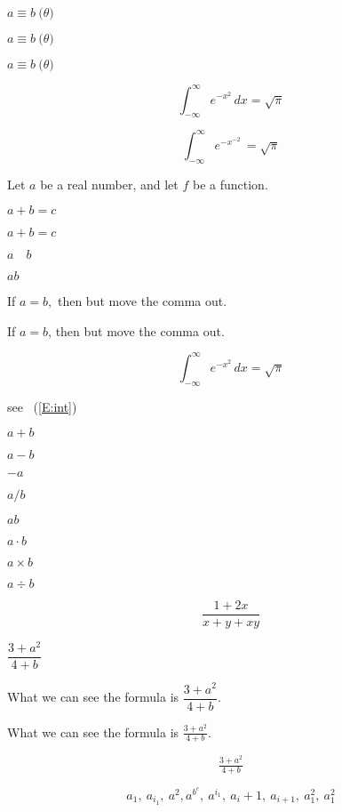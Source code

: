 \documentclass{article}
\begin{document}
	
$a \equiv b \pod {\theta} $

\(a \equiv b \pod{\theta} \)

\begin{math}
	a \equiv b \pod{\theta}
\end{math}
	
\[
	\int_{-\infty}^{\infty} e^{-x^{2}} \, dx = \sqrt{\pi}
\]	
	
\begin{displaymath}
	\int_{-\infty}^{\infty} e^{-x^{-2}} \, = \sqrt{\pi}
\end{displaymath}

Let $a$ be a real number, and let $f$ be a function.




$a+b=c$

$a +b = c$

$a \quad b$

$a b$


If $a=b,$ then 
but move the comma out.

If $a=b$, then but move the comma out. 



\begin{equation}\label{E:int}
	\int_{-\infty}^{\infty} e^{-x^{2}} \, dx = \sqrt{\pi}
\end{equation}


see~ (\ref{E:int})


 
$ a +b$

$a-b$

$-a$

$a/b$

$a b$


$a \cdot b$

$a \times b$

$a \div b$


\[
	\frac{1+2x}{x+y+xy}
\]



$\dfrac{3+a^{2}}{4+b}$

What we can see the formula is $\dfrac{3+a^{2}}{4+b}$.  

What we can see the formula is $\tfrac{3+a^{2}}{4+b}$. 


\[
	\tfrac{3+a^{2}}{4+b}
\]


\[
a_{1}, \ a_{i_{1}}, \ a^{2}, a^{b^{c}}, \ a^{i_{1}}, 
\ a_{i} + 1, 
\ a_{i+1}, \ a_{1}^{2}, \ a^{2}_{1}
\]
\end{document}
